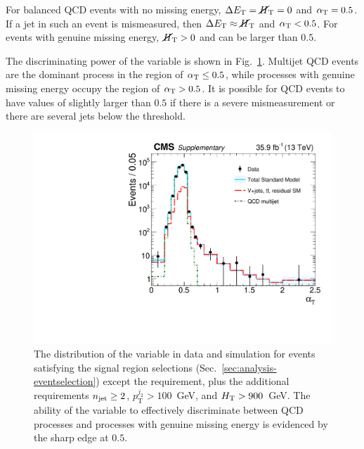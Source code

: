 For balanced QCD events with no missing energy, $\Delta E_\mathrm T = \mbox{$\cancel{H}_\text{T}$} = 0$ 
and $\alpha_{\text{T}} = 0.5$. If a jet in such an event is mismeasured, then $\Delta 
E_\mathrm T \approx \mbox{$\cancel{H}_\text{T}$}$ and $\alpha_{\text{T}} < 0.5$. For events with genuine missing 
energy, $\mbox{$\cancel{H}_\text{T}$} > 0$ and \alphat can be larger than $0.5$.

The discriminating power of the \alphat variable is shown in 
Fig.~\ref{fig:alphat}. Multijet QCD events are the dominant process in the 
region of $\alpha_{\text{T}} \leq 0.5$, while processes with genuine missing energy 
occupy the region of $\alpha_{\text{T}} > 0.5$. It is possible for QCD events to have 
values of \alphat slightly larger than $0.5$ if there is a severe 
mismeasurement or there are several jets below the \pt threshold.




\begin{figure}[t!]
\begin{center}
\includegraphics[width=0.7\linewidth]{figs/analysis/propaganda_alphat_180210}
\caption{The distribution of the \alphat variable in data and simulation for 
events satisfying the signal region selections 
(Sec.~\ref{sec:analysis-eventselection}) except the \alphat requirement, plus 
the additional requirements $n_{\text{jet}} \geq 2$, $p_{\mathrm{T}}^{j_2} > 
100$~GeV, and $\mbox{$H_\text{T}$} > 900$~GeV. The 
ability of the variable to effectively discriminate between QCD processes and 
processes with genuine missing energy is evidenced by the sharp edge at $0.5$.} 
\label{fig:alphat}
\end{center}
\end{figure}


